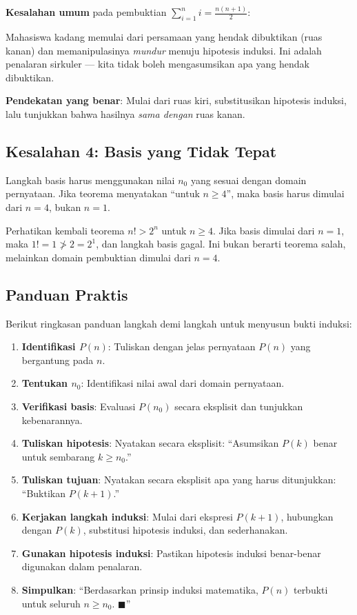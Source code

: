 \begin{contoh}
\textbf{Kesalahan umum} pada pembuktian $\sum_{i=1}^{n} i = \frac{n(n+1)}{2}$:

Mahasiswa kadang memulai dari persamaan yang hendak dibuktikan (ruas kanan) dan memanipulasinya \emph{mundur} menuju hipotesis induksi. Ini adalah penalaran sirkuler --- kita tidak boleh mengasumsikan apa yang hendak dibuktikan.

\textbf{Pendekatan yang benar}: Mulai dari ruas kiri, substitusikan hipotesis induksi, lalu tunjukkan bahwa hasilnya \emph{sama dengan} ruas kanan.
\end{contoh}

\subsection{Kesalahan 4: Basis yang Tidak Tepat}

Langkah basis harus menggunakan nilai $n_0$ yang sesuai dengan domain pernyataan. Jika teorema menyatakan ``untuk $n \geq 4$'', maka basis harus dimulai dari $n = 4$, bukan $n = 1$.

\begin{contoh}
Perhatikan kembali teorema $n! > 2^n$ untuk $n \geq 4$. Jika basis dimulai dari $n = 1$, maka $1! = 1 \not> 2 = 2^1$, dan langkah basis gagal. Ini bukan berarti teorema salah, melainkan domain pembuktian dimulai dari $n = 4$.
\end{contoh}

\subsection{Panduan Praktis}

Berikut ringkasan panduan langkah demi langkah untuk menyusun bukti induksi:

\begin{enumerate}
  \item \textbf{Identifikasi $P(n)$}: Tuliskan dengan jelas pernyataan $P(n)$ yang bergantung pada $n$.
  \item \textbf{Tentukan $n_0$}: Identifikasi nilai awal dari domain pernyataan.
  \item \textbf{Verifikasi basis}: Evaluasi $P(n_0)$ secara eksplisit dan tunjukkan kebenarannya.
  \item \textbf{Tuliskan hipotesis}: Nyatakan secara eksplisit: ``Asumsikan $P(k)$ benar untuk sembarang $k \geq n_0$.''
  \item \textbf{Tuliskan tujuan}: Nyatakan secara eksplisit apa yang harus ditunjukkan: ``Buktikan $P(k+1)$.''
  \item \textbf{Kerjakan langkah induksi}: Mulai dari ekspresi $P(k+1)$, hubungkan dengan $P(k)$, substitusi hipotesis induksi, dan sederhanakan.
  \item \textbf{Gunakan hipotesis induksi}: Pastikan hipotesis induksi benar-benar digunakan dalam penalaran.
  \item \textbf{Simpulkan}: ``Berdasarkan prinsip induksi matematika, $P(n)$ terbukti untuk seluruh $n \geq n_0$. $\blacksquare$''
\end{enumerate}

